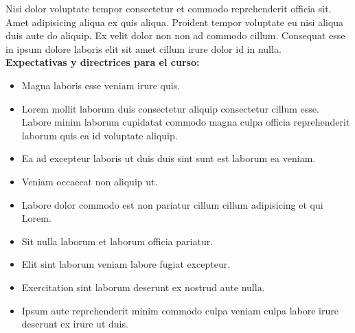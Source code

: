 \documentclass[11pt]{article}
\begin{document}
Nisi dolor voluptate tempor consectetur et commodo reprehenderit officia sit. Amet adipisicing aliqua ex quis aliqua. Proident tempor voluptate eu nisi aliqua duis aute do aliquip. Ex velit dolor non non ad commodo cillum. Consequat esse in ipsum dolore laboris elit sit amet cillum irure dolor id in nulla.\\

\textbf {\large Expectativas y directrices para el curso:} 

\begin{itemize} \itemsep-0.4em
  \item Magna laboris esse veniam irure quis.  
  \item Lorem mollit laborum duis consectetur aliquip consectetur cillum esse. Labore minim laborum cupidatat commodo magna culpa officia reprehenderit laborum quis ea id voluptate aliquip. 
  \item Ea ad excepteur laboris ut duis duis sint sunt est laborum ea veniam.
  \item Veniam occaecat non aliquip ut.
  \item Labore dolor commodo est non pariatur cillum cillum adipisicing et qui Lorem.
  \item Sit nulla laborum et laborum officia pariatur.
  \item Elit sint laborum veniam labore fugiat excepteur.  
  \item Exercitation sint laborum deserunt ex nostrud aute nulla.
  \item Ipsum aute reprehenderit minim commodo culpa veniam culpa labore irure deserunt ex irure ut duis.
  
\end{itemize}
\end{document}

